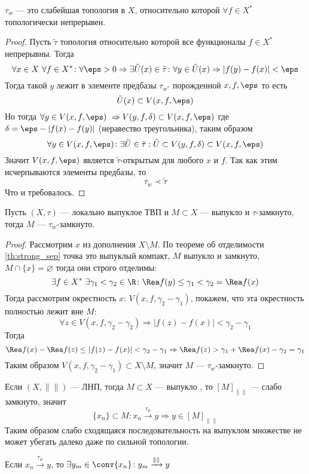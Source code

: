 \begin{claim}
	$\tau_w$ --- это слабейшая топология в $X$, относительно которой $\forall f \in X^*$ топологически непрерывен. 
\end{claim}
\begin{proof}
	Пусть $\tilde{\tau}$ топология относительно которой все функционалы $f\in X^*$ непрерывны. Тогда 
	$$
	\forall x \in X\ \forall f \in X^* \colon \forall \eps > 0 \Rightarrow\exists \tilde{U}(x) \in \tilde{\tau}\colon \forall y \in \tilde{U}(x) \Rightarrow |f(y) - f(x)| < \eps
	$$
	Тогда такой $y$ лежит в элементе предбазы $\tau_{w^*}$ порожденной $x,f,\eps$ то есть
	$$
	\tilde{U}(x) \subset V(x,f,\eps)
	$$
	Но тогда $\forall y \in V(x,f,\eps) \ \Rightarrow V(y,f,\delta) \subset V(x,f,\eps)$ где $\delta = \eps - |f(x) - f(y)|$ (неравество треугольника), таким образом
	$$
	\forall y \in V(x,f,\eps)\colon \exists \tilde{U} \in \tilde{\tau}: \tilde{U} \subset V(y,f,\delta) \subset V(x,f,\eps)
	$$
	Значит $V(x,f,\eps)$ является $\tilde{\tau}$-открытым для любого $x$ и $f$. Так как этим исчерпываются элементы предбазы, то  
	$$
	\tau_w \prec \tilde{\tau}
	$$
	Что и требовалось.
\end{proof}
\begin{theorem}[Мазур]\label{th:mazur}
	Пусть $(X,\tau)$ --- локально выпуклое ТВП и $M \subset X$ --- выпукло и $\tau$-замкнуто, тогда $M$ --- $\tau_w$-замкнуто.
\end{theorem}
\begin{proof}
	Рассмотрим $x$ из дополнения $ X \setminus M$. По теореме об отделимости \ref{th:strong_sep} точка это выпуклый компакт, $M$ выпукло и замкнуто, $M \cap \{x\} = \varnothing$ тогда они строго отделимы:
	$$
	\exists f \in X^*\ \exists \gamma_1 < \gamma_2 \in \R\colon \Rea f(y) \leq \gamma_1 < \gamma_2 =\Rea f(x)
	$$
	Тогда рассмотрим окрестность $x$: $V(x,f, \gamma_2 - \gamma_1)$, покажем, что эта окрестность полностью лежит вне $M$: 
	$$
	\forall z \in V(x,f,\gamma_2 - \gamma_2) \Rightarrow |f(z) - f(x)| < \gamma_2 - \gamma_1
	$$
	Тогда 
	$$
	\Rea f(x) - \Rea f(z) \leq |f(z) - f(x)| < \gamma_2 - \gamma_1 \Rightarrow \Rea f(z) > \gamma_1 + \Rea f(x)  - \gamma_2 = \gamma_1
	$$
	Таким образом $V(x,f,\gamma_2 - \gamma_1) \subset X \setminus M$, значит $M$ --- $\tau_w$-замкнуто.
\end{proof}
\begin{next0}
	Если $(X, \|\|)$ --- ЛНП, тогда $M \subset X$ --- выпукло , то $[M]_{\|\|}$ --- слабо замкнуто, значит
	$$
	\{x_n\} \subset M\colon x_n \xrightarrow{\tau_w} y \Rightarrow  y \in [M]_{\|\|}
	$$
	Таким образом слабо сходящаяся последовательность на выпуклом множестве не может убегать далеко даже по сильной топологии.
\end{next0}
\begin{next0}
	Если $x_n \xrightarrow{\tau_w} y$, то $\exists y_m \in \conv\{x_n\}\colon y_{m} \xrightarrow{\|\|} y$
\end{next0}


